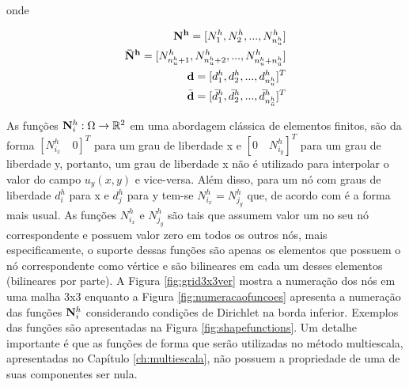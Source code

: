 onde

\begin{eqnarray*}
\mathbf{N^h} = [N^h_1, N^h_2, ..., N^h_{n_u^h} ] \\
\mathbf{\bar{N}^h}  =[N^h_{n_u^h + 1}, N^h_{n_u^h + 2}, ..., N^h_{n_u^h + n_{\bar{u}}^h}] \\
\mathbf{d} = [d_1^h, d_2^h, ... , d_{n_u^h}^h]^T \\
\bar{\mathbf{d}} = [\bar{d}_1^h, \bar{d}_2^h, ... , \bar{d}_{n_{\bar{u}}^h}^h]^T
\end{eqnarray*}



As funções ${\mathbf{N}_{i}^h}: \Omega \rightarrow \mathbb{R}^2$ em uma abordagem clássica de elementos finitos, são da forma $[N^h_{i_x} \quad 0]^T$ para um grau de liberdade x e  $[0 \quad N^h_{i_y}]^T$  para um grau de liberdade y, portanto, um grau de liberdade x não é utilizado para interpolar o valor do campo $u_y(x, y)$ e vice-versa. Além disso, para um nó com  graus de liberdade $d^h_i$ para x e $d^h_j$ para y tem-se $N^h_{i_x} = N^h_{j_y}$ que, de acordo com \cite{jacob} é a forma mais usual.
As funções $N^h_{i_x}$  e $N^h_{j_y}$ são tais que assumem valor um no seu nó correspondente e possuem valor zero em todos os outros nós, mais especificamente, o suporte dessas funções são apenas os elementos que possuem o nó correspondente como vértice e são bilineares em cada um desses elementos (bilineares por parte). A Figura \ref{fig:grid3x3ver} mostra a numeração dos nós em uma malha 3x3 enquanto a Figura \ref{fig:numeracaofuncoes} apresenta a numeração das funções ${\mathbf{N}_{i}^h}$ considerando condições de Dirichlet na borda inferior.
Exemplos das funções são apresentadas na Figura \ref{fig:shapefunctions}.
Um detalhe importante é que as funções de forma que serão utilizadas no método multiescala, apresentadas no Capítulo \ref{ch:multiescala}, não possuem a propriedade de uma de suas componentes ser nula.


